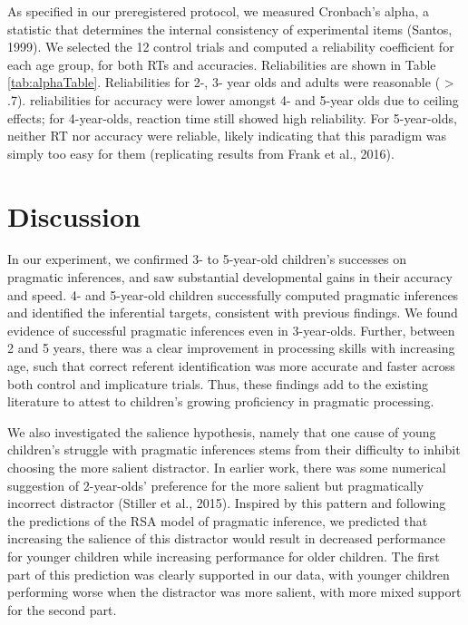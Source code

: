 \documentclass[man]{apa6}
\begin{document}
As specified in our preregistered protocol, we measured Cronbach's
alpha, a statistic that determines the internal consistency of
experimental items (Santos, 1999). We selected the 12 control trials and
computed a reliability coefficient for each age group, for both RTs and
accuracies. Reliabilities are shown in Table \ref{tab:alphaTable}.
Reliabilities for 2-, 3- year olds and adults were reasonable (
\textgreater{} .7). reliabilities for accuracy were lower amongst 4- and
5-year olds due to ceiling effects; for 4-year-olds, reaction time still
showed high reliability. For 5-year-olds, neither RT nor accuracy were
reliable, likely indicating that this paradigm was simply too easy for
them (replicating results from Frank et al., 2016).

\section{Discussion}\label{discussion}

In our experiment, we confirmed 3- to 5-year-old children's successes on
pragmatic inferences, and saw substantial developmental gains in their
accuracy and speed. 4- and 5-year-old children successfully computed
pragmatic inferences and identified the inferential targets, consistent
with previous findings. We found evidence of successful pragmatic
inferences even in 3-year-olds. Further, between 2 and 5 years, there
was a clear improvement in processing skills with increasing age, such
that correct referent identification was more accurate and faster across
both control and implicature trials. Thus, these findings add to the
existing literature to attest to children's growing proficiency in
pragmatic processing.

We also investigated the salience hypothesis, namely that one cause of
young children's struggle with pragmatic inferences stems from their
difficulty to inhibit choosing the more salient distractor. In earlier
work, there was some numerical suggestion of 2-year-olds' preference for
the more salient but pragmatically incorrect distractor (Stiller et al.,
2015). Inspired by this pattern and following the predictions of the RSA
model of pragmatic inference, we predicted that increasing the salience
of this distractor would result in decreased performance for younger
children while increasing performance for older children. The first part
of this prediction was clearly supported in our data, with younger
children performing worse when the distractor was more salient, with
more mixed support for the second part.
\end{document}
